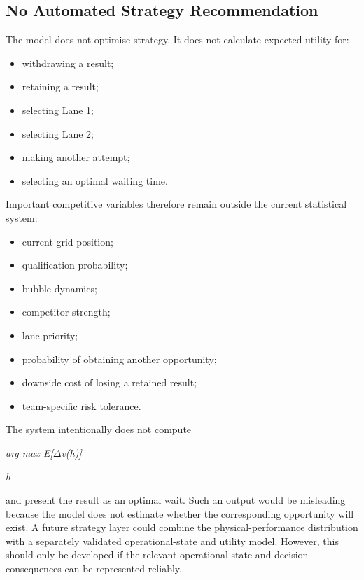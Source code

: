\subsection{No Automated Strategy Recommendation}
The model does not optimise strategy. It does not calculate expected utility for:

\begin{itemize}
\item withdrawing a result;
\item retaining a result;
\item selecting Lane 1;
\item selecting Lane 2;
\item making another attempt;
\item selecting an optimal waiting time.
\end{itemize}

Important competitive variables therefore remain outside the current statistical system:

\begin{itemize}
\item current grid position;
\item qualification probability;
\item bubble dynamics;
\item competitor strength;
\item lane priority;
\item probability of obtaining another opportunity;
\item downside cost of losing a retained result;
\item team-specific risk tolerance.
\end{itemize}

The system intentionally does not compute

\begin{center}\textit{arg max E[\ensuremath{\Delta}v(h)]}\end{center}

\begin{center}\textit{h}\end{center}

and present the result as an optimal wait. Such an output would be misleading because the model does not estimate whether the corresponding opportunity will exist. A future strategy layer could combine the physical-performance distribution with a separately validated operational-state and utility model. However, this should only be developed if the relevant operational state and decision consequences can be represented reliably.

